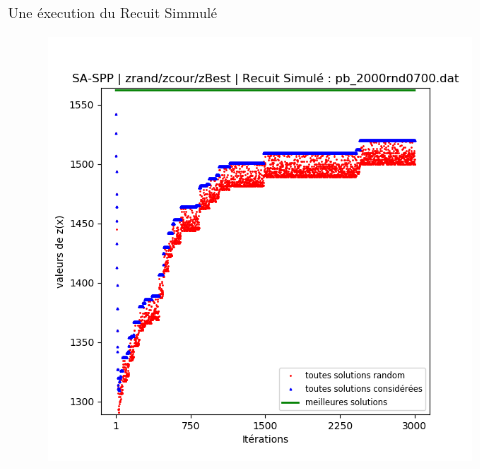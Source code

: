 \begin{example}
  Une éxecution du Recuit Simmulé
  \begin{figure}[htb!]
    \centering
    \includegraphics[scale=0.5]{fig/recuit.png}
    \label{fig:recuit}
  \end{figure}
\end{example}


